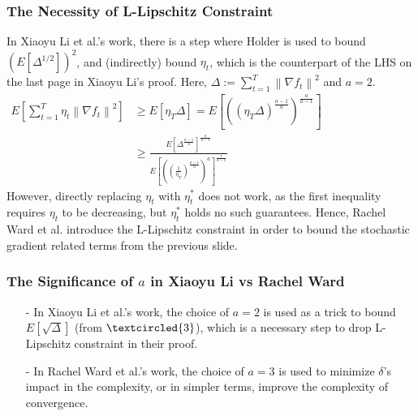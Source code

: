 \documentclass{beamer}
\begin{document}
\begin{frame}
\frametitle{The Necessity of L-Lipschitz Constraint}
    
    In Xiaoyu Li et al.'s work, there is a step where Holder is used to bound $\left(E\left[\Delta^{1 / 2}\right]\right)^{2}$, and (indirectly) bound $\eta_t$, which is the counterpart of the LHS on the last page in Xiaoyu Li's proof. Here, $\Delta:=\sum_{t=1}^T\left\|\nabla f_t\right\|^2$ and $a = 2$.
    $\begin{aligned} E\left[\sum_{t=1}^T \eta_t\left\|\nabla f_t\right\|^2\right] & \geq E\left[\eta_T \Delta\right]=E\left[\left(\left(\eta_T \Delta\right)^{\frac{a-1}{a}}\right)^{\frac{a}{a-1}}\right]\\ & \geq \frac{E\left[\Delta^{\frac{a-1}{a}}\right]^{\frac{a}{a-1}}}{E\left[\left(\left(\frac{1}{\eta_T}\right)^{\frac{a-1}{a}}\right)^{a}\right]^{\frac{1}{a-1}}}\end{aligned}$ \\  
    However, directly replacing $\eta_t$ with $\eta_t^*$ does not work, as the first inequality requires $\eta_t$ to be decreasing, but $\eta_t^*$ holds no such guarantees.
    Hence, Rachel Ward et al. introduce the L-Lipschitz constraint in order to bound the stochastic gradient related terms from the previous slide. 
\end{frame}

\begin{frame}
\frametitle{The Significance of $a$ in Xiaoyu Li vs Rachel Ward}
    
    
    \begin{enumerate}
        \item [- ]In Xiaoyu Li et al.'s work, the choice of $a=2$ is used as a trick to bound $E\left[\sqrt{\Delta}\right]$ (from $\textcircled{3}$), which is a necessary step to drop L-Lipschitz constraint in their proof. 
        \item [- ] In Rachel Ward et al.'s work, the choice of $a=3$ is used to minimize $\delta$'s impact in the complexity, or in simpler terms, improve the complexity of convergence.
    \end{enumerate} 
    
\end{frame}
\end{document}
